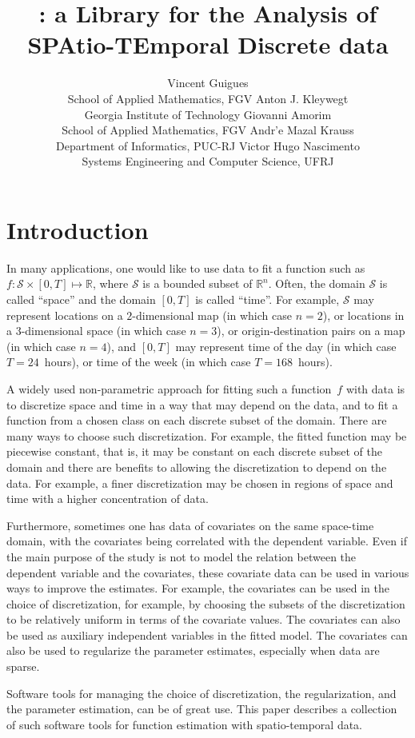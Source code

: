 \documentclass[article]{jss}
\author{Vincent Guigues\\School of Applied Mathematics, FGV \And 
        Anton J. Kleywegt\\Georgia Institute of Technology \And
        Giovanni Amorim\\School of Applied Mathematics, FGV  \And
        Andr'e Mazal Krauss\\Department of Informatics, PUC-RJ \And
        Victor Hugo Nascimento\\Systems Engineering and Computer Science, UFRJ
}
\title{\pkg{LASPATED}: a Library for the Analysis of SPAtio-TEmporal Discrete data}
\newcommand{\RR}{\mathbb{R}}
\begin{document}

\section{Introduction}

In many applications, one would like to use data to fit a function such as $f : \mathcal{S} \times [0,T] \mapsto \RR$, where $\mathcal{S}$ is a bounded subset of $\RR^{n}$.
Often, the domain $\mathcal{S}$ is called “space'' and the domain $[0,T]$ is called “time''.
For example, $\mathcal{S}$ may represent locations on a $2$-dimensional map (in which case $n = 2$), or locations in a $3$-dimensional space (in which case $n = 3$), or origin-destination pairs on a map (in which case $n = 4$), and $[0,T]$ may represent time of the day (in which case $T = 24$~hours), or time of the week (in which case $T = 168$~hours).

A widely used non-parametric approach for fitting such a function~$f$ with data is to discretize space and time in a way that may depend on the data, and to fit a function from a chosen class on each discrete subset of the domain.
There are many ways to choose such discretization. For example, the fitted function may be piecewise constant, that is, it may be constant on each discrete subset of the domain and there are benefits to allowing the discretization to depend on the data.
For example, a finer discretization may be chosen in regions of space and time with a higher concentration of data.

Furthermore, sometimes one has data of covariates on the same space-time domain, with the covariates being correlated with the dependent variable.
Even if the main purpose of the study is not to model the relation between the dependent variable and the covariates, these covariate data can be used in various ways to improve the estimates.
For example, the covariates can be used in the choice of discretization, for example, by choosing the subsets of the discretization to be relatively uniform in terms of the covariate values.
The covariates can also be used as auxiliary independent variables in the fitted model.
The covariates can also be used to regularize the parameter estimates, especially when data are sparse.

Software tools for managing the choice of discretization, the regularization, and the parameter estimation, can be of great use.
This paper describes a collection of such software tools for function estimation with spatio-temporal data.
\end{document}
